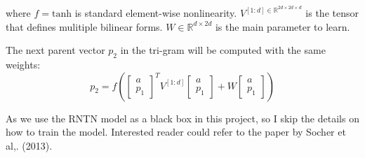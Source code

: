 where $f = \textrm{tanh}$ is standard element-wise nonlinearity. $V^{[1:d] \in \mathbb{R}^{2d \times 2d \times d}}$ is the tensor that defines mulitiple bilinear forms. $W \in \mathbb{R}^{d \times 2d}$ is the main parameter to learn. 

The next parent vector $p_2$ in the tri-gram will be computed with the same weights:
\begin{equation*}
p_2 = f \left(  
\begin{bmatrix}
a \\ p_1
\end{bmatrix}^T
V^{[1:d]} 
\begin{bmatrix}
a \\ p_1
\end{bmatrix}
+ W
\begin{bmatrix}
a \\ p_1
\end{bmatrix}
 \right)
\end{equation*}

As we use the RNTN model as a black box in this project, so I skip the details on how to train the model. Interested reader could refer to the paper by Socher et al,. (2013). 



